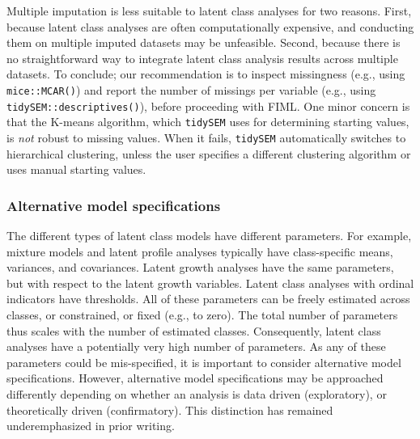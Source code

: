\documentclass[
  ,man]{apa6}
\begin{document}
Multiple imputation is less suitable to latent class analyses for two reasons.
First, because latent class analyses are often computationally expensive,
and conducting them on multiple imputed datasets may be unfeasible.
Second, because there is no straightforward way to integrate latent class analysis results across multiple datasets.
To conclude; our recommendation is to inspect missingness (e.g., using \texttt{mice::MCAR()})
and report the number of missings per variable (e.g., using \texttt{tidySEM::descriptives()}),
before proceeding with FIML.
One minor concern is that the K-means algorithm,
which \texttt{tidySEM} uses for determining starting values,
is \emph{not} robust to missing values.
When it fails, \texttt{tidySEM} automatically switches to hierarchical clustering,
unless the user specifies a different
clustering algorithm or uses manual starting values.

\hypertarget{alternative-model-specifications}{%
\subsubsection{Alternative model specifications}\label{alternative-model-specifications}}

The different types of latent class models have different parameters.
For example, mixture models and latent profile analyses typically have class-specific means, variances, and covariances.
Latent growth analyses have the same parameters, but with respect to the latent growth variables.
Latent class analyses with ordinal indicators have thresholds.
All of these parameters can be freely estimated across classes, or constrained,
or fixed (e.g., to zero).
The total number of parameters thus scales with the number of estimated classes.
Consequently, latent class analyses have a potentially very high number of parameters.
As any of these parameters could be mis-specified,
it is important to consider alternative model specifications.
However, alternative model specifications may be approached differently depending on whether an analysis is data driven (exploratory), or theoretically driven (confirmatory).
This distinction has remained underemphasized in prior writing.
\end{document}
